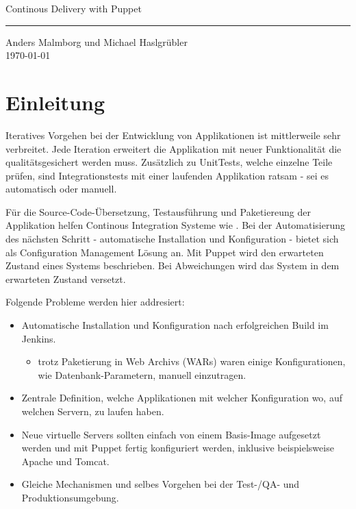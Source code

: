 \documentclass[12pt,a4paper,ngerman]{article}
\begin{document}
 \begin{titlepage}
     \begin{flushright}{\huge Continous Delivery with Puppet}
	\end{flushright}
	\hrule
      
      \begin{flushright}
	  {\large Anders Malmborg und Michael Haslgrübler}\\
	  \today
	\end{flushright}
 \end{titlepage}

\pagestyle{plain}

\section{Einleitung}

Iteratives Vorgehen bei der Entwicklung von Applikationen ist mittlerweile sehr verbreitet. Jede Iteration erweitert die Applikation mit neuer Funktionalität die qualitätsgesichert werden muss. Zusätzlich zu UnitTests, welche einzelne Teile prüfen, sind Integrationstests mit einer laufenden Applikation ratsam - sei es automatisch oder manuell.

Für die Source-Code-Übersetzung, Testausführung und Paketiereung der Applikation helfen Continous Integration Systeme wie \cite{jenkins}.  Bei der Automatisierung des nächsten Schritt - automatische Installation und Konfiguration - bietet sich \cite{puppet} als Configuration Management Lösung an. Mit Puppet wird den erwarteten Zustand eines Systems beschrieben. Bei Abweichungen wird das System in dem erwarteten Zustand versetzt.

Folgende Probleme werden hier addresiert:
\begin{itemize}
\item Automatische Installation und Konfiguration nach erfolgreichen Build im Jenkins.
\begin{itemize}
\item trotz Paketierung in Web Archivs (WARs) waren einige Konfigurationen, wie Datenbank-Parametern, manuell einzutragen.
\end{itemize}
\item Zentrale Definition, welche Applikationen mit welcher Konfiguration wo, auf welchen Servern, zu laufen haben.
\item Neue virtuelle Servers sollten einfach von einem Basis-Image aufgesetzt werden und mit Puppet fertig konfiguriert werden, inklusive beispielsweise Apache und Tomcat.
\item Gleiche Mechanismen und selbes Vorgehen bei der Test-/QA- und Produktionsumgebung.
\end{itemize}
\end{document}

